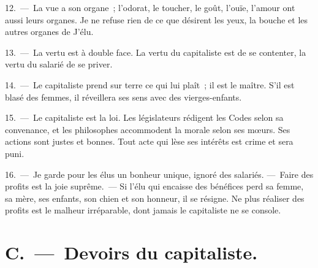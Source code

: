 \documentclass[french,twoside]{book} %
\begin{document}
12. — La vue a son organe ; l’odorat, le toucher, le goût, l’ouïe, l’amour ont aussi leurs organes. Je ne refuse rien de ce que désirent les yeux, la bouche et les autres organes de J'élu.\par
13. — La vertu est à double face. La vertu du capitaliste est de se contenter, la vertu du salarié de se priver.\par
14. — Le capitaliste prend sur terre ce qui lui plaît ; il est le maître. S'il est blasé des femmes, il réveillera ses sens avec des vierges-enfants.\par
15. — Le capitaliste est la loi. Les législateurs rédigent les Codes selon sa convenance, et les philosophes accommodent la morale selon ses mœurs. Ses actions sont justes et bonnes. Tout acte qui lèse ses intérêts est crime et sera puni.\par
16. — Je garde pour les élus un bonheur unique, ignoré des salariés. — Faire des profits est la joie suprême. — Si l’élu qui encaisse des bénéfices perd sa femme, sa mère, ses enfants, son chien et son honneur, il se résigne. Ne plus réaliser des profits est le malheur irréparable, dont jamais le capitaliste ne se console.

\section[{C. — Devoirs du capitaliste.}]{C. — Devoirs du capitaliste.}
\end{document}
